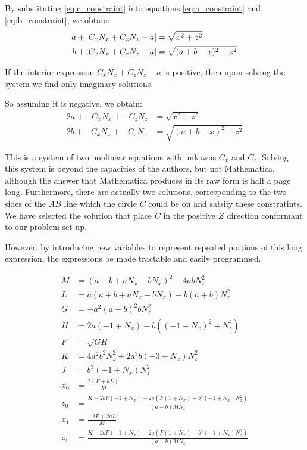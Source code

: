 \documentclass{article}
\begin{document}
By substituting \ref{eq:c_constraint} into equations
\ref{eq:a_constraint} and \ref{eq:b_constraint},
we obtain:
\begin{align}
  a + \left\lvert C_x N_x + C_z N_z - a\right\rvert &= \sqrt{x^2 + z ^2} \\
  b + \left\lvert C_x N_x + C_z N_z - a\right\rvert &= \sqrt{(a+b-x)^2 + z^2}
\end{align}

If the interior expression $C_x N_x + C_z N_z - a$ is positive,
then upon solving the system we find only imaginary solutions.

So assuming it is negative, we obtain:
\begin{align}
  2a + -C_x N_x + -C_z N_z  &= \sqrt{x^2 + z ^2} \\
  2b + -C_x N_x + -C_z N_z  &= \sqrt{(a+b-x)^2 + z^2}
\end{align}



This is a system of two nonlinear equations with unkowns $C_x$ and $C_z$.
Solving this system is beyond the capacities of the authors,
but not Mathematica, although the answer that Mathematica produces
in its raw form is half a page long.
Furthermore, there are actually two solutions, corresponding
to the two sides of the $AB$ line which the circle $C$ could be
on and satsify these constratints.
We have selected the solution that place $C$ in the positive $Z$
direction conformant to our problem set-up.

However, by introducing new variables to represent repeated
portions of this long expression, the expressions be
made tractable and easily programmed.

\begin{align}
M &= (a + b + a N_x - b N_x)^2 - 4 a b N_z^2 \\
L &= a (a + b + a N_x - b N_x) - b (a + b) N_z^2 \\
G &= -a^2 (a - b)^2 b N_z^2 \\
H &= 2 a (-1 + N_x) - b ((-1 + N_x)^2 + N_z^2) \\
F &= \sqrt{G H} \\
K &= 4 a^2 b^2 N_z^2 + 2 a^3 b (-3 + N_x) N_z^2 \\
J &= b^3 (-1 + N_x) N_z^2 \\
x_0 &= \frac{2 (F + a L)}{M} \\
z_0 &= \frac{K + 2 b F (-1 + N_x) -
  2 a (F (1 + N_x) + b^3 (-1 + N_x) N_z^2)}
{(a -  b) M N_z} \\
x_1 &= \frac{-2 F + 2 a L}{M} \\
  z_1 &= \frac{K - 2 b F (-1 + N_x) +
    2 a (F (1 + N_x) - b^3 (-1 + N_x) N_z^2)}
  {(a - b) M N_z}
\end{align}
\end{document}
